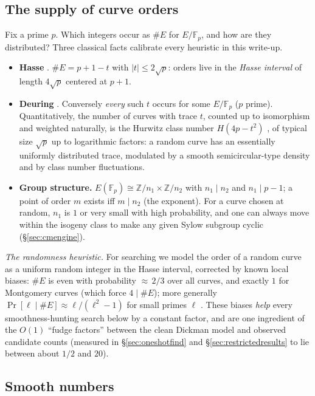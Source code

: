 \documentclass[11pt]{amsart}
\newcommand{\F}{\mathbb{F}}
\newcommand{\Z}{\mathbb{Z}}
\theoremstyle{plain}
\theoremstyle{definition}
\theoremstyle{remark}
\begin{document}
\subsection{The supply of curve orders}\label{sec:supply}

Fix a prime $p$.  Which integers occur as $\#E$ for $E/\F_p$, and how are they distributed?  Three
classical facts calibrate every heuristic in this write-up.

\begin{itemize}
\item \textbf{Hasse} \cite{Sil09}.  $\#E = p + 1 - t$ with $|t| \le 2\sqrt p$: orders live in the
\emph{Hasse interval} of length $4\sqrt p$ centered at $p+1$.
\item \textbf{Deuring} \cite{Deu41,Wat69}.  Conversely \emph{every} such $t$ occurs for some $E/\F_p$
($p$ prime).  Quantitatively, the number of curves with trace $t$, counted up to isomorphism and
weighted naturally, is the Hurwitz class number $H(4p-t^2)$ \cite{Deu41,Scho87}, of typical size
$\sqrt p$ up to logarithmic factors: a random curve has an essentially uniformly distributed trace,
modulated by a smooth semicircular-type density and by class number fluctuations.
\item \textbf{Group structure.}  $E(\F_p) \cong \Z/n_1 \times \Z/n_2$ with $n_1 \mid n_2$ and
$n_1 \mid p-1$; a point of order $m$ exists iff $m \mid n_2$ (the exponent).  For a curve chosen at
random, $n_1$ is $1$ or very small with high probability, and one can always move within the isogeny
class to make any given Sylow subgroup cyclic (\S\ref{sec:cmengine}).
\end{itemize}

\emph{The randomness heuristic.}  For searching we model the order of a random curve as a uniform
random integer in the Hasse interval, corrected by known local biases: $\#E$ is even with probability
${\approx}\,2/3$ over all curves, and exactly $1$ for Montgomery curves (which force $4 \mid \#E$); more
generally $\Pr[\ell \mid \#E] \approx \ell/(\ell^2-1)$ for small primes $\ell$
\cite[Prop.~1.14]{Len87}.  These biases \emph{help} every smoothness-hunting search below by a constant
factor, and are one ingredient of the $O(1)$ ``fudge factors'' between the clean Dickman model and
observed candidate counts (measured in \S\ref{sec:oneshotfind} and \S\ref{sec:restrictedresults} to lie
between about $1/2$ and $20$).

\subsection{Smooth numbers}\label{sec:smooth}
\end{document}
